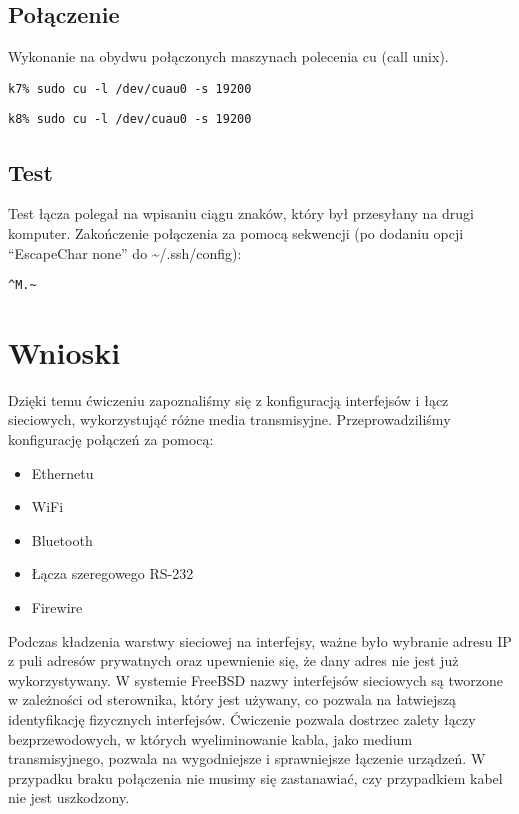 \documentclass[a4paper,11pt,notitlepage]{article}
\begin{document}
\subsection{Połączenie}
Wykonanie na obydwu połączonych maszynach polecenia cu (call unix).
\begin{verbatim}
k7% sudo cu -l /dev/cuau0 -s 19200
\end{verbatim}
\begin{verbatim}
k8% sudo cu -l /dev/cuau0 -s 19200
\end{verbatim}
\subsection{Test}
Test łącza polegał na wpisaniu ciągu znaków, który był przesyłany na drugi komputer.
Zakończenie połączenia za pomocą sekwencji (po dodaniu opcji ``EscapeChar none'' do \textasciitilde/.ssh/config):
\begin{verbatim}
^M.~
\end{verbatim}
\section{Wnioski}
Dzięki temu ćwiczeniu zapoznaliśmy się z konfiguracją interfejsów i łącz sieciowych, wykorzystująć różne media transmisyjne.
Przeprowadziliśmy konfigurację połączeń za pomocą:
\begin{itemize}
    \item Ethernetu
    \item WiFi
    \item Bluetooth
    \item Łącza szeregowego RS-232
    \item Firewire
\end{itemize}
Podczas kładzenia warstwy sieciowej na interfejsy, ważne było wybranie adresu IP z puli adresów prywatnych oraz upewnienie się, że dany adres nie jest już wykorzystywany.
W systemie FreeBSD nazwy interfejsów sieciowych są tworzone w zależności od sterownika, który jest używany, co pozwala na łatwiejszą identyfikację fizycznych interfejsów.
Ćwiczenie pozwala dostrzec zalety łączy bezprzewodowych, w których wyeliminowanie kabla, jako medium transmisyjnego, pozwala na wygodniejsze
i sprawniejsze łączenie urządzeń. W przypadku braku połączenia nie musimy się zastanawiać, czy przypadkiem kabel nie jest uszkodzony.
\end{document}
